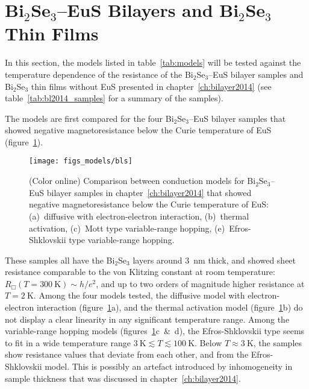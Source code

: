 \section{Bi$_2$Se$_3$--EuS Bilayers and Bi$_2$Se$_3$ Thin Films}
In this section, the models listed in table~\ref{tab:models} will be tested against the temperature dependence of the resistance of the Bi$_2$Se$_3$--EuS bilayer samples and Bi$_2$Se$_3$ thin films without EuS presented in chapter~\ref{ch:bilayer2014} (see table~\ref{tab:bl2014_samples} for a summary of the samples).

The models are first compared for the four Bi$_2$Se$_3$--EuS bilayer samples that showed negative magnetoresistance below the Curie temperature of EuS (figure~\ref{fig:models_bls}). %
\begin{figure}[ht]%
    \centering%
    \texttt{[image: figs\_models/bls]}%
    \caption[Conduction model comparison: Bi$_2$Se$_3$--EuS bilayers: BL1--BL3]{\label{fig:models_bls}(Color online) Comparison between conduction models for Bi$_2$Se$_3$--EuS bilayer samples in chapter~\ref{ch:bilayer2014} that showed negative magnetoresistance below the Curie temperature of EuS: (a)~diffusive with electron-electron interaction, (b)~thermal activation, (c)~Mott type variable-range hopping, (e)~Efros-Shklovskii type variable-range hopping.}%
\end{figure}%
%
These samples all have the Bi$_2$Se$_3$ layers around \SI{3}{nm} thick, and showed sheet resistance comparable to the von Klitzing constant at room temperature: $R_\Box(T=300~\mathrm{K}) \sim h/e^2$, and up to two orders of magnitude higher resistance at $T = 2~\mathrm{K}$. Among the four models tested, the diffusive model with electron-electron interaction (figure~\ref{fig:models_bls}a), and the thermal activation model (figure~\ref{fig:models_bls}b) do not display a clear linearity in any significant temperature range. Among the variable-range hopping models (figures~\ref{fig:models_bls}c~\&~d), the Efros-Shklovskii type seems to fit in a wide temperature range $3~\mathrm{K} \lesssim T \lesssim 100~\mathrm{K}$. Below $T \approx 3~\mathrm{K}$, the samples show resistance values that deviate from each other, and from the Efros-Shklovskii model. This is possibly an artefact introduced by inhomogeneity in sample thickness that was discussed in chapter~\ref{ch:bilayer2014}.

